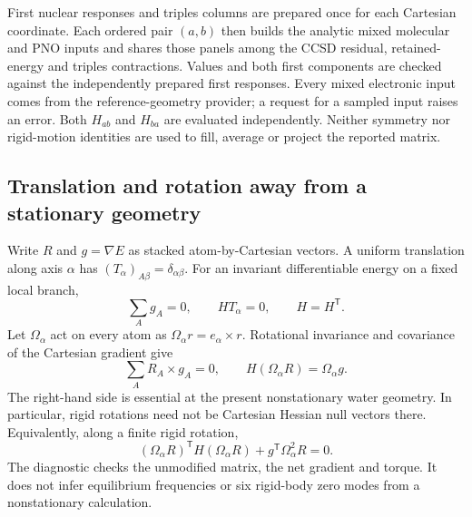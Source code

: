 \documentclass[11pt]{article}
\begin{document}
First nuclear responses and triples columns are prepared once for each
Cartesian coordinate. Each ordered pair $(a,b)$ then builds the analytic
mixed molecular and PNO inputs and shares those panels among the CCSD
residual, retained-energy and triples contractions. Values and both first
components are checked against the independently prepared first responses.
Every mixed electronic input comes from the reference-geometry provider;
a request for a sampled input raises an error. Both $H_{ab}$ and $H_{ba}$
are evaluated independently. Neither symmetry nor rigid-motion identities
are used to fill, average or project the reported matrix.

\subsection{Translation and rotation away from a stationary geometry}
Write $R$ and $g=\nabla E$ as stacked atom-by-Cartesian vectors. A uniform
translation along axis $\alpha$ has $(T_\alpha)_{A\beta}=\delta_{\alpha\beta}$.
For an invariant differentiable energy on a fixed local branch,
\begin{equation}
 \sum_A g_A=0,\qquad HT_\alpha=0,\qquad H=H^{\mathsf T}.
\end{equation}
Let $\Omega_\alpha$ act on every atom as
$\Omega_\alpha r=e_\alpha\mathbin{\times}r$. Rotational invariance and
covariance of the Cartesian gradient give
\begin{equation}
 \sum_A R_A\mathbin{\times}g_A=0,\qquad
 H(\Omega_\alpha R)=\Omega_\alpha g.
\end{equation}
The right-hand side is essential at the present nonstationary water
geometry. In particular, rigid rotations need not be Cartesian Hessian
null vectors there. Equivalently, along a finite rigid rotation,
\begin{equation}
 (\Omega_\alpha R)^{\mathsf T}H(\Omega_\alpha R)
                +g^{\mathsf T}\Omega_\alpha^2 R=0.
\end{equation}
The diagnostic checks the unmodified matrix, the net gradient and torque.
It does not infer equilibrium frequencies or six rigid-body zero modes
from a nonstationary calculation.
\end{document}
